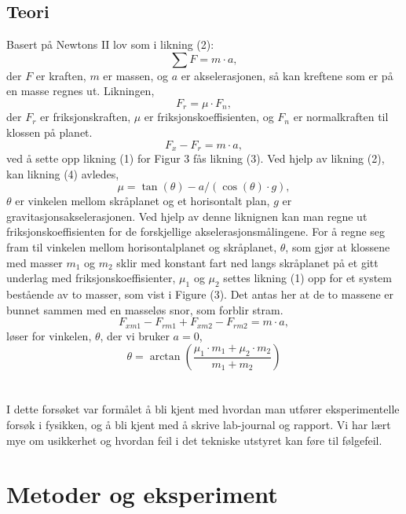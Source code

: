 \documentclass[10pt,a4paper]{report}
\begin{document}
\section*{Teori}
Basert på Newtons II lov som i likning (2): 
\begin{equation}
\sum{F} = m \cdot a,
\end{equation} der $F$ er kraften, $m$ er massen, og $a$ er akselerasjonen, så kan kreftene som er på en masse regnes ut. Likningen,
\begin{equation}
F_r = \mu \cdot F_n,
\end{equation}
der $F_r$ er friksjonskraften, $\mu$ er friksjonskoeffisienten, og $F_n$ er normalkraften til klossen på planet. 
\begin{equation}
F_x - F_r = m \cdot a,
\end{equation}
ved å sette opp likning (1) for Figur 3 fås likning (3). Ved hjelp av likning (2), kan likning (4) avledes,
\begin{equation}
\mu = \tan(\theta)-a/(\cos(\theta)\cdot g),
\end{equation}
$\theta$ er vinkelen mellom skråplanet og et horisontalt plan, $g$ er gravitasjonsakselerasjonen. Ved hjelp av denne liknignen kan man regne ut friksjonskoeffisienten for de forskjellige akselerasjonsmålingene. For å regne seg fram til vinkelen mellom horisontalplanet og skråplanet, $\theta$, som gjør at klossene med masser $m_1$ og $m_2$ sklir med konstant fart ned langs skråplanet på et gitt underlag med friksjonskoeffisienter, $\mu_1$ og $\mu_2$ settes likning (1) opp for et system bestående av to masser, som vist i Figure (3). Det antas her at de to massene er bunnet sammen med en masseløs snor, som forblir stram.
\begin{equation}
F_{xm1} - F_{rm1} + F_{xm2} - F_{rm2} = m \cdot a,
\end{equation}
løser for vinkelen, $\theta$, der vi bruker $a = 0$, 
\begin{equation}
\theta = \arctan(\frac{\mu_1 \cdot m_1+\mu_2 \cdot m_2}{m_1+m_2})
\end{equation}
\\
\\I dette forsøket var formålet å bli kjent med hvordan man utfører eksperimentelle forsøk i fysikken, og å bli kjent med å skrive lab-journal og rapport. Vi har lært mye om usikkerhet og hvordan feil i det tekniske utstyret kan føre til følgefeil.

\chapter*{Metoder og eksperiment}
\end{document}
